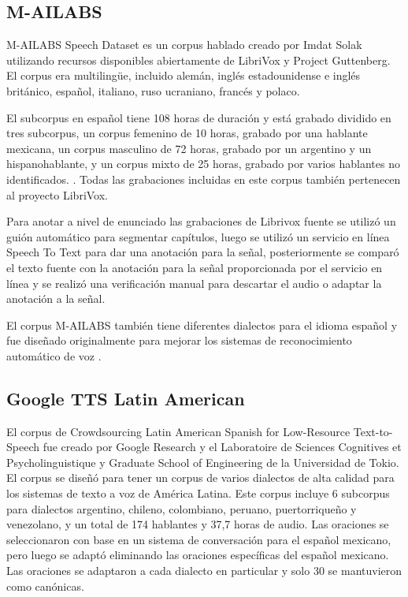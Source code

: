 \documentclass[a4paper,12pt,twoside]{report}
\begin{document}
\subsection{M-AILABS}

M-AILABS Speech Dataset es un corpus hablado creado por Imdat Solak utilizando recursos disponibles abiertamente de LibriVox y Project Guttenberg. El corpus era multilingüe, incluido alemán, inglés estadounidense e inglés británico, español, italiano, ruso ucraniano, francés y polaco.

El subcorpus en español tiene 108 horas de duración y está grabado dividido en tres subcorpus, un corpus femenino de 10 horas, grabado por una hablante mexicana, un corpus masculino de 72 horas, grabado por un argentino y un hispanohablante, y un corpus mixto de 25 horas, grabado por varios hablantes no identificados. . Todas las grabaciones incluidas en este corpus también pertenecen al proyecto LibriVox.

Para anotar a nivel de enunciado las grabaciones de Librivox fuente se utilizó un guión automático para segmentar capítulos, luego se utilizó un servicio en línea Speech To Text para dar una anotación para la señal, posteriormente se comparó el texto fuente con la anotación para la señal proporcionada por el servicio en línea y se realizó una verificación manual para descartar el audio o adaptar la anotación a la señal.

El corpus M-AILABS también tiene diferentes dialectos para el idioma español y fue diseñado originalmente para mejorar los sistemas de reconocimiento automático de voz \cite{M-AILABS}.

\subsection{Google TTS Latin American}

El corpus de Crowdsourcing Latin American Spanish for Low-Resource Text-to-Speech fue creado por Google Research y el Laboratoire de Sciences Cognitives et Psycholinguistique y Graduate School of Engineering de la Universidad de Tokio. El corpus se diseñó para tener un corpus de varios dialectos de alta calidad para los sistemas de texto a voz de América Latina. Este corpus incluye 6 subcorpus para dialectos argentino, chileno, colombiano, peruano, puertorriqueño y venezolano, y un total de 174 hablantes y 37,7 horas de audio. Las oraciones se seleccionaron con base en un sistema de conversación para el español mexicano, pero luego se adaptó eliminando las oraciones específicas del español mexicano. Las oraciones se adaptaron a cada dialecto en particular y solo 30 se mantuvieron como canónicas.
\end{document}

